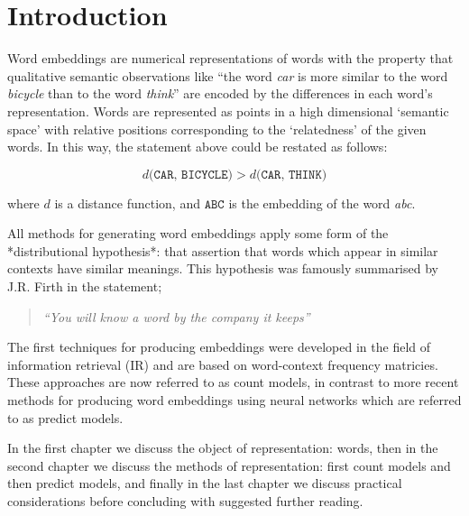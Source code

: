\chapter*{Introduction}
Word embeddings are numerical representations of words with the property that qualitative semantic observations like ``the word \emph{car} is more similar to the word \emph{bicycle} than to the word \emph{think}'' are encoded by the differences in each word's representation. Words are represented as points in a high dimensional `semantic space' with relative positions corresponding to the `relatedness' of the given words. In this way, the statement above could be restated as follows:

\[d\big(\texttt{CAR},\,\texttt{BICYCLE}\big)>d\big(\texttt{CAR},\,\texttt{THINK}\big)\]

where $d$ is a distance function, and $\texttt{ABC}$ is the embedding of the word \emph{abc}.

All methods for generating word embeddings apply some form of the *distributional hypothesis*: that assertion that words which appear in similar contexts have similar meanings. This hypothesis was famously summarised by J.R. Firth in the statement;

\begin{quote}
  \emph{``You will know a word by the company it keeps''}
\end{quote}

The first techniques for producing embeddings were developed in the field of information retrieval (IR) and are based on word-context frequency matricies. These approaches are now referred to as count models, in contrast to more recent methods for producing word embeddings using neural networks which are referred to as predict models.

In the first chapter we discuss the object of representation: words, then in the second chapter we discuss the methods of representation: first count models and then predict models, and finally in the last chapter we discuss practical considerations before concluding with suggested further reading.

